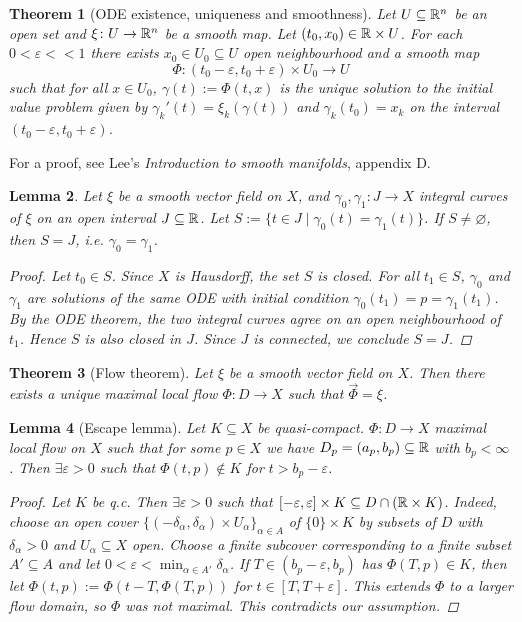 \documentclass[A4paper, british]{amsart}
\theoremstyle{darkgreentheorem}
\newtheorem{thm}{Theorem}[section]
\newtheorem{lm}[thm]{Lemma}
\theoremstyle{darkbluedefinition}
\theoremstyle{darkredexample}
\theoremstyle{remark}
\newcommand{\1}{\mathbbm{1}}
\newcommand{\tms}{\times}
\newcommand{\sub}{\subseteq}
\begin{document}
\begin{thm}[ODE existence, uniqueness and smoothness]
    Let $U\sub \R^{n}$ be an open set and $\xi\colon U\to \mathbb{R}^{n}$ be a smooth map.
    Let $(t_{0},x_{0})\in \R\tms U$.
    For each $0<\varepsilon <<1$ there exists $x_{0}\in U_{0}\sub U$ open neighbourhood and a smooth map
    \[ \Phi\colon (t_{0}-\varepsilon,t_{0}+\varepsilon)\tms U_{0}\to U \]
    such that for all $x\in U_{0}$, $\gamma(t):=\Phi(t,x)$ is the unique solution to the initial value problem given by $\gamma_{k}'(t)=\xi_{k}(\gamma(t))$ and $\gamma_{k}(t_{0})=x_{k}$ on the interval $(t_{0}-\varepsilon ,t_{0}+\varepsilon )$.
\end{thm}

For a proof, see Lee's \textit{Introduction to smooth manifolds}, appendix D.

\begin{lm}
    Let $\xi$ be a smooth vector field on $X$, and $\gamma_{0},\gamma_{1}\colon J\to X$ integral curves of $\xi$ on an open interval $J\sub \R$.
    Let $S:=\{t\in J\mid \gamma_{0}(t)=\gamma_{1}(t)\}$.
    If $S\neq \varnothing$, then $S=J$, i.e. $\gamma_{0}=\gamma_{1}$.
    \begin{proof}
	Let $t_{0}\in S$.
	Since $X$ is Hausdorff, the set $S$ is closed.
	For all $t_{1}\in S$, $\gamma_{0}$ and $\gamma_{1}$ are solutions of the same ODE with initial condition $\gamma_{0}(t_{1})=p=\gamma_{1}(t_{1})$.
	By the ODE theorem, the two integral curves agree on an open neighbourhood of $t_{1}$.
	Hence $S$ is also closed in $J$.
	Since $J$ is connected, we conclude $S=J$.
    \end{proof}
\end{lm}

\begin{thm}[Flow theorem]
    Let $\xi$ be a smooth vector field on $X$.
    Then there exists a unique maximal local flow $\Phi\colon D\to X$ such that $\vec{\Phi}=\xi$.
\end{thm}

\begin{lm}[Escape lemma]
    Let $K\sub X$ be quasi-compact.
    $\Phi\colon D\to X$ maximal local flow on $X$ such that for some $p\in X$ we have $D_{p}=(a_{p},b_{p})\sub \R$ with $b_{p}<\infty$.
    Then $\exists \varepsilon >0$ such that $\Phi(t,p)\not\in K$ for $t>b_{p}-\varepsilon$.
    \begin{proof}
	Let $K$ be q.c.
	Then $\exists \varepsilon >0$ such that $[-\varepsilon,\varepsilon ]\tms K\sub D\cap (\R\tms K)$.
	Indeed, choose an open cover $\{(-\delta_{\alpha},\delta_{\alpha})\tms U_{\alpha}\}_{\alpha\in A}$ of $\{0\}\tms K$ by subsets of $D$ with $\delta_{\alpha}>0$ and $U_{\alpha}\sub X$ open.
	Choose a finite subcover corresponding to a finite subset $A'\sub A$ and let $0<\varepsilon <\min_{\alpha\in A'}{\delta_{\alpha}}$.
	If $T\in (b_{p}-\varepsilon,b_{p})$ has $\Phi(T,p)\in K$, then let $\Phi(t,p):=\Phi(t-T,\Phi(T,p))$ for $t\in [T,T+\varepsilon ]$.
	This extends $\Phi$ to a larger flow domain, so $\Phi$ was not maximal.
	This contradicts our assumption.
    \end{proof}
\end{lm}
\end{document}
